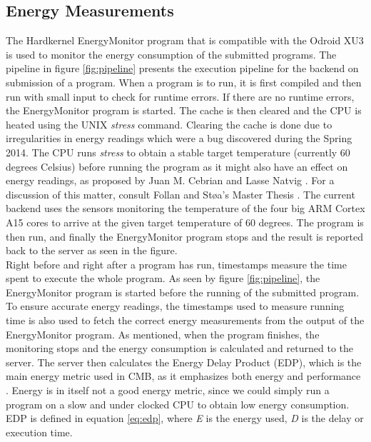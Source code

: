 \subsection{Energy Measurements}
\label{sec:em-cmb}
The Hardkernel EnergyMonitor program that is compatible with the Odroid XU3 is used to monitor the energy consumption of the submitted programs. The pipeline in figure \ref{fig:pipeline} presents the execution pipeline for the backend on submission of a program. When a program is to run, it is first compiled and then run with small input to check for runtime errors. If there are no runtime errors, the EnergyMonitor program is started. The cache is then cleared and the CPU is heated using the UNIX \textit{stress} \cite{m:stress} command. Clearing the cache is done due to irregularities in energy readings which were a bug discovered during the Spring 2014. The CPU runs \textit{stress} to obtain a stable target temperature (currently 60 degrees Celsius) before running the program as it might also have an effect on energy readings, as proposed by Juan M. Cebrian and Lasse Natvig \cite{a:JL:T}. For a discussion of this matter, consult Follan and Støa's Master Thesis \cite{mt:T&S}. The current backend uses the sensors monitoring the temperature of the four big ARM Cortex A15 cores to arrive at the given target temperature of 60 degrees. The program is then run, and finally the EnergyMonitor program stops and the result is reported back to the server as seen in the figure. \\

Right before and right after a program has run, timestamps measure the time spent to execute the whole program. As seen by figure \ref{fig:pipeline}, the EnergyMonitor program is started before the running of the submitted program. To ensure accurate energy readings, the timestamps used to measure running time is also used to fetch the correct energy measurements from the output of the EnergyMonitor program.  As mentioned, when the program finishes, the monitoring stops and the energy consumption is calculated and returned to the server. The server then calculates the Energy Delay Product (EDP), which is the main energy metric used in CMB, as it emphasizes both energy and performance \cite{b:edp}. Energy is in itself not a good energy metric, since we could simply run a program on a slow and under clocked CPU to obtain low energy consumption. EDP is defined in equation \ref{eq:edp}, where \textit{E} is the energy used, \textit{D} is the delay or execution time.

